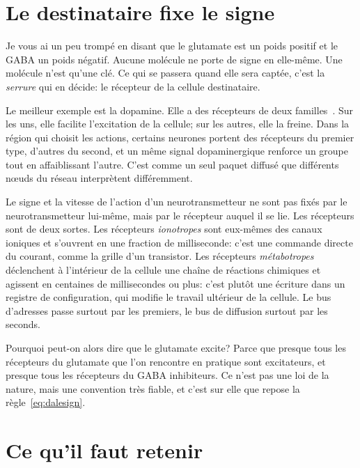 \section{Le destinataire fixe le signe}
\label{sec:receiver}

Je vous ai un peu trompé en disant que le glutamate est un poids positif et le GABA un poids négatif. Aucune molécule ne porte de signe en elle-même. Une molécule n'est qu'une clé. Ce qui se passera quand elle sera captée, c'est la \emph{serrure} qui en décide: le récepteur de la cellule destinataire.

Le meilleur exemple est la dopamine. Elle a des récepteurs de deux familles~\cite{Beaulieu2011}. Sur les uns, elle facilite l'excitation de la cellule; sur les autres, elle la freine. Dans la région qui choisit les actions, certains neurones portent des récepteurs du premier type, d'autres du second, et un même signal dopaminergique renforce un groupe tout en affaiblissant l'autre. C'est comme un seul paquet diffusé que différents nœuds du réseau interprètent différemment.

\begin{keyblock}
\begin{proposition}
\label{prop:receptor}
Le signe et la vitesse de l'action d'un neurotransmetteur ne sont pas fixés par le neurotransmetteur lui-même, mais par le récepteur auquel il se lie. Les récepteurs sont de deux sortes. Les récepteurs \emph{ionotropes} sont eux-mêmes des canaux ioniques et s'ouvrent en une fraction de milliseconde: c'est une commande directe du courant, comme la grille d'un transistor. Les récepteurs \emph{métabotropes} déclenchent à l'intérieur de la cellule une chaîne de réactions chimiques et agissent en centaines de millisecondes ou plus: c'est plutôt une écriture dans un registre de configuration, qui modifie le travail ultérieur de la cellule. Le bus d'adresses passe surtout par les premiers, le bus de diffusion surtout par les seconds.
\end{proposition}
\end{keyblock}

Pourquoi peut-on alors dire que \og le glutamate excite\fg? Parce que presque tous les récepteurs du glutamate que l'on rencontre en pratique sont excitateurs, et presque tous les récepteurs du GABA inhibiteurs. Ce n'est pas une loi de la nature, mais une convention très fiable, et c'est sur elle que repose la règle~\eqref{eq:dalesign}.

\section{Ce qu'il faut retenir}

